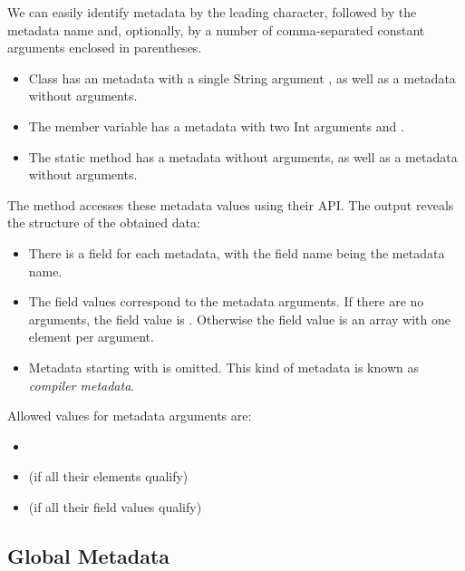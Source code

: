 
We can easily identify metadata by the leading  character, followed by the metadata name and, optionally, by a number of comma-separated constant arguments enclosed in parentheses.

\begin{itemize}
	\item Class  has an  metadata with a single String argument , as well as a  metadata without arguments.
	\item The member variable  has a  metadata with two Int arguments  and .
	\item The static method  has a  metadata without arguments, as well as a  metadata without arguments.
\end{itemize}

The  method accesses these metadata values using their API. The output reveals the structure of the obtained data:

\begin{itemize}
	\item There is a field for each metadata, with the field name being the metadata name.
	\item The field values correspond to the metadata arguments. If there are no arguments, the field value is . Otherwise the field value is an array with one element per argument.
	\item Metadata starting with \expr{:} is omitted. This kind of metadata is known as \emph{compiler metadata}.
\end{itemize}

Allowed values for metadata arguments are:

\begin{itemize}
	\item {}
	\item {} (if all their elements qualify)
	\item {} (if all their field values qualify)
\end{itemize}


\subsection{Global Metadata}
\label{lf-metadata-global}

